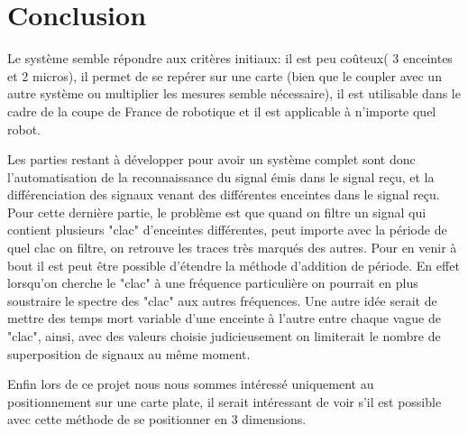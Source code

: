 \documentclass[12pt,a4paper]{report}
\begin{document}
\part{Conclusion}

Le système semble répondre aux critères initiaux: il est peu coûteux( 3 enceintes et 2 micros), il permet de se repérer sur une carte (bien que le coupler avec un autre système ou multiplier les mesures semble nécessaire), il est utilisable dans le cadre de la coupe de France de robotique et il est applicable à n'importe quel robot.

Les parties restant à développer pour avoir un système complet sont donc l'automatisation de la reconnaissance du signal émis dans le signal reçu, et la différenciation des signaux venant des différentes enceintes dans le signal reçu. Pour cette dernière partie, le problème est que quand on filtre un signal qui contient plusieurs "clac" d'enceintes différentes, peut importe avec la période de quel clac on filtre, on retrouve les traces très marqués des autres. Pour en venir à bout il est peut être possible d'étendre la méthode d'addition de période. En effet lorsqu'on cherche le "clac" à une fréquence particulière on pourrait en plus soustraire le spectre des "clac" aux autres fréquences. Une autre idée serait de mettre des temps mort variable d'une enceinte à l'autre entre chaque vague de "clac", ainsi, avec des valeurs choisie judicieusement on limiterait le nombre de superposition de signaux au même moment. 

Enfin lors de ce projet nous nous sommes intéressé uniquement au positionnement sur une carte plate, il serait intéressant de voir s'il est possible avec cette méthode de se positionner en 3 dimensions.




\end{document}
